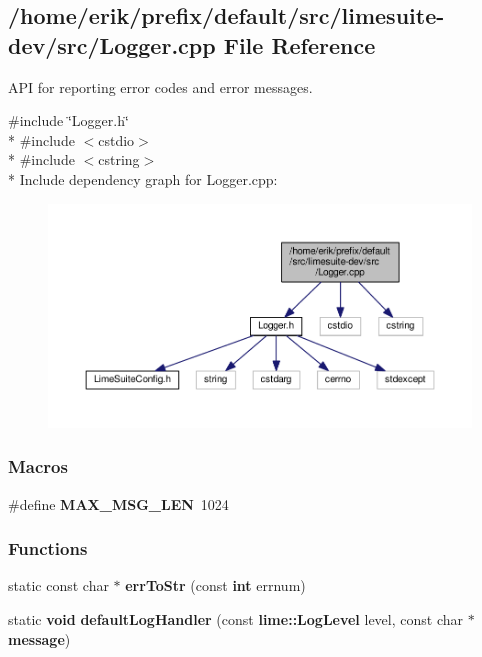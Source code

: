 \subsection{/home/erik/prefix/default/src/limesuite-\/dev/src/\+Logger.cpp File Reference}
\label{Logger_8cpp}


A\+PI for reporting error codes and error messages.  


{\ttfamily \#include \char`\"{}Logger.\+h\char`\"{}}\\*
{\ttfamily \#include $<$cstdio$>$}\\*
{\ttfamily \#include $<$cstring$>$}\\*
Include dependency graph for Logger.\+cpp\+:
\nopagebreak
\begin{figure}[H]
\begin{center}
\leavevmode
\includegraphics[width=350pt]{d7/de6/Logger_8cpp__incl}
\end{center}
\end{figure}
\subsubsection*{Macros}
\begin{DoxyCompactItemize}
\item 
\#define {\bf M\+A\+X\+\_\+\+M\+S\+G\+\_\+\+L\+EN}~1024
\end{DoxyCompactItemize}
\subsubsection*{Functions}
\begin{DoxyCompactItemize}
\item 
static const char $\ast$ {\bf err\+To\+Str} (const {\bf int} errnum)
\item 
static {\bf void} {\bf default\+Log\+Handler} (const {\bf lime\+::\+Log\+Level} level, const char $\ast${\bf message})
\end{DoxyCompactItemize}
